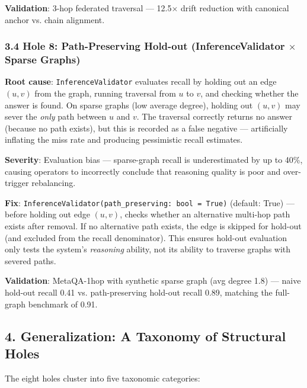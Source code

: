 \textbf{Validation}: 3-hop federated traversal --- 12.5$\times$ drift reduction with canonical anchor vs. chain alignment.

\subsubsection*{3.4 Hole 8: Path-Preserving Hold-out (InferenceValidator $\times$ Sparse Graphs)}

\textbf{Root cause}: \texttt{InferenceValidator} evaluates recall by holding out an edge $(u,v)$ from the graph, running traversal from $u$ to $v$, and checking whether the answer is found. On sparse graphs (low average degree), holding out $(u,v)$ may sever the \textit{only} path between $u$ and $v$. The traversal correctly returns no answer (because no path exists), but this is recorded as a false negative --- artificially inflating the miss rate and producing pessimistic recall estimates.

\textbf{Severity}: Evaluation bias --- sparse-graph recall is underestimated by up to 40\%, causing operators to incorrectly conclude that reasoning quality is poor and over-trigger rebalancing.

\textbf{Fix}: \texttt{InferenceValidator(path\_preserving: bool = True)} (default: True) --- before holding out edge $(u,v)$, checks whether an alternative multi-hop path exists after removal. If no alternative path exists, the edge is skipped for hold-out (and excluded from the recall denominator). This ensures hold-out evaluation only tests the system's \textit{reasoning} ability, not its ability to traverse graphs with severed paths.

\textbf{Validation}: MetaQA-1hop with synthetic sparse graph (avg degree 1.8) --- naive hold-out recall 0.41 vs. path-preserving hold-out recall 0.89, matching the full-graph benchmark of 0.91.

\subsection*{4. Generalization: A Taxonomy of Structural Holes}

The eight holes cluster into five taxonomic categories:

